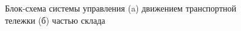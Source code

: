\begin{figure}
    \qquad
    \caption{Блок-схема системы управления (a) движением транспортной тележки (б) частью склада}
    \label{fig:rcwar}
\end{figure}

